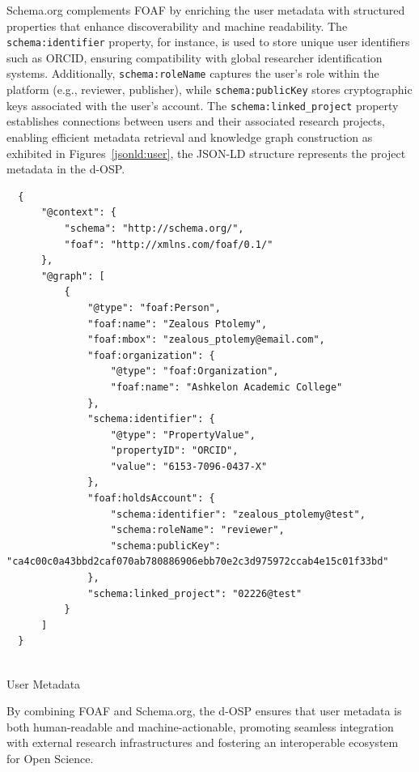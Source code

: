 \documentclass[final]{rc-book-2.14}
\begin{document}
Schema.org complements FOAF by enriching the user metadata with structured properties that enhance discoverability and machine readability. The \texttt{schema:identifier} property, for instance, is used to store unique user identifiers such as ORCID, ensuring compatibility with global researcher identification systems. Additionally, \texttt{schema:roleName} captures the user’s role within the platform (e.g., reviewer, publisher), while \texttt{schema:publicKey} stores cryptographic keys associated with the user’s account. The \texttt{schema:linked\_project} property establishes connections between users and their associated research projects, enabling efficient metadata retrieval and knowledge graph construction as exhibited in Figures~\ref{jsonld:user}, the JSON-LD structure represents the project metadata in the d-OSP.

\begin{listing}
    \begin{verbatim}
  {
      "@context": {
          "schema": "http://schema.org/",
          "foaf": "http://xmlns.com/foaf/0.1/"
      },
      "@graph": [
          {
              "@type": "foaf:Person",
              "foaf:name": "Zealous Ptolemy",
              "foaf:mbox": "zealous_ptolemy@email.com",
              "foaf:organization": {
                  "@type": "foaf:Organization",
                  "foaf:name": "Ashkelon Academic College"
              },
              "schema:identifier": {
                  "@type": "PropertyValue",
                  "propertyID": "ORCID",
                  "value": "6153-7096-0437-X"
              },
              "foaf:holdsAccount": {
                  "schema:identifier": "zealous_ptolemy@test",
                  "schema:roleName": "reviewer",
                  "schema:publicKey": "ca4c00c0a43bbd2caf070ab780886906ebb70e2c3d975972ccab4e15c01f33bd"
              },
              "schema:linked_project": "02226@test"
          }
      ]
  }
  
\end{verbatim}
    \caption{User Metadata}
    \label{jsonld:user}
\end{listing}


By combining FOAF and Schema.org, the d-OSP ensures that user metadata is both human-readable and machine-actionable, promoting seamless integration with external research infrastructures and fostering an interoperable ecosystem for Open Science.
\end{document}
